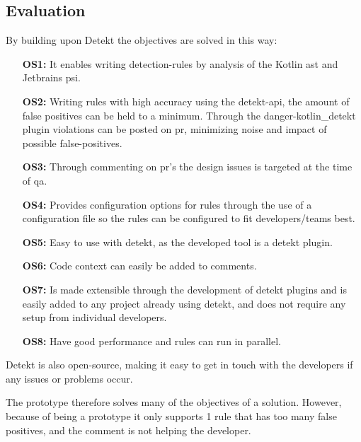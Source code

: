 \documentclass{report}
\begin{document}
\subsection*{Evaluation}

By building upon Detekt the objectives are solved in this way:
\begin{itemize}
    \item [\textbf{OS1:}] It enables writing detection-rules by analysis of the Kotlin \gls{ast} and Jetbrains \gls{psi}.
    
    \item [\textbf{OS2:}] Writing rules with high accuracy using the detekt-api, the amount of false positives can be held to a minimum. Through the danger-kotlin\_detekt plugin violations can be posted on \gls{pr}, minimizing noise and impact of possible false-positives.
    
    \item [\textbf{OS3:}] Through commenting on \gls{pr}'s the design issues is targeted at the time of \gls{qa}.
    
    \item [\textbf{OS4:}] Provides configuration options for rules through the use of a configuration file so the rules can be configured to fit developers/teams best.
    
    \item [\textbf{OS5:}] Easy to use with detekt, as the developed tool is a detekt plugin.
    
    \item [\textbf{OS6:}] Code context can easily be added to comments.
    
    \item [\textbf{OS7:}] Is made extensible through the development of detekt plugins and is easily added to any project already using detekt, and does not require any setup from individual developers.

    \item [\textbf{OS8:}] Have good performance and rules can run in parallel. 
\end{itemize}

Detekt is also open-source, making it easy to get in touch with the developers if any issues or problems occur.


The prototype therefore solves many of the objectives of a solution. However, because of being a prototype it only supports 1 rule that has too many false positives, and the comment is not helping the developer.
\end{document}

